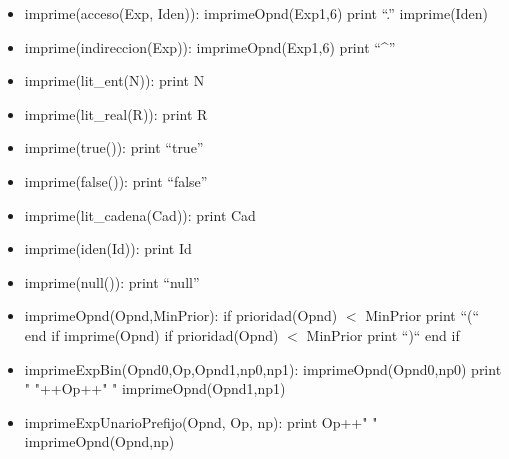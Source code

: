 \documentclass[11pt]{article}
\begin{document}
\begin{itemize}
            \item imprime(acceso(Exp, Iden)):
                \subitem imprimeOpnd(Exp1,6)
                \subitem print “.”
                \subitem imprime(Iden)
            
            \item imprime(indireccion(Exp)):
                \subitem imprimeOpnd(Exp1,6)
                \subitem print “\^{}”
            
            \item imprime(lit\_ent(N)):
                \subitem print N
            
            \item imprime(lit\_real(R)):
                \subitem print R
            
            \item imprime(true()):
                \subitem print “true”
            
            \item imprime(false()):
                \subitem print “false”
            
            \item imprime(lit\_cadena(Cad)):
                \subitem print Cad
            
            \item imprime(iden(Id)):
                \subitem print Id
            
            \item imprime(null()):
                \subitem print “null”
                \item imprimeOpnd(Opnd,MinPrior):
                \subitem if prioridad(Opnd) $<$ MinPrior
                    \subsubitem print “(“
                \subitem end if
                \subitem imprime(Opnd)
                \subitem if prioridad(Opnd) $<$ MinPrior
                    \subsubitem print “)“
                \subitem end if
            
            \item imprimeExpBin(Opnd0,Op,Opnd1,np0,np1):
                \subitem imprimeOpnd(Opnd0,np0) 
                \subitem print " "++Op++" " 
                \subitem imprimeOpnd(Opnd1,np1) 
            
            \item imprimeExpUnarioPrefijo(Opnd, Op, np):
                \subitem print Op++" " 
                \subitem imprimeOpnd(Opnd,np)
            

\end{itemize}
\end{document}

